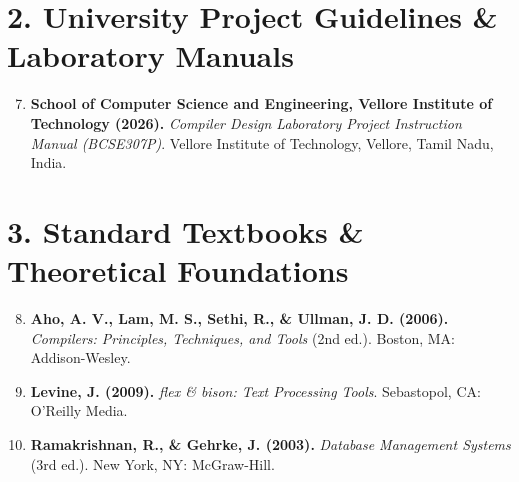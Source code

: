 \documentclass[11pt,a4paper]{article}
\begin{document}
\section*{2. University Project Guidelines \& Laboratory Manuals}

\begin{enumerate}
    \setcounter{enumi}{6}
    \item \textbf{School of Computer Science and Engineering, Vellore Institute of Technology (2026).} 
    \textit{Compiler Design Laboratory Project Instruction Manual (BCSE307P)}. 
    Vellore Institute of Technology, Vellore, Tamil Nadu, India.
\end{enumerate}

\section*{3. Standard Textbooks \& Theoretical Foundations}

\begin{enumerate}
    \setcounter{enumi}{7}
    \item \textbf{Aho, A. V., Lam, M. S., Sethi, R., \& Ullman, J. D. (2006).} 
    \textit{Compilers: Principles, Techniques, and Tools} (2nd ed.). 
    Boston, MA: Addison-Wesley.
    
    \item \textbf{Levine, J. (2009).} 
    \textit{flex \& bison: Text Processing Tools}. 
    Sebastopol, CA: O'Reilly Media.
    
    \item \textbf{Ramakrishnan, R., \& Gehrke, J. (2003).} 
    \textit{Database Management Systems} (3rd ed.). 
    New York, NY: McGraw-Hill.
\end{enumerate}
\end{document}
